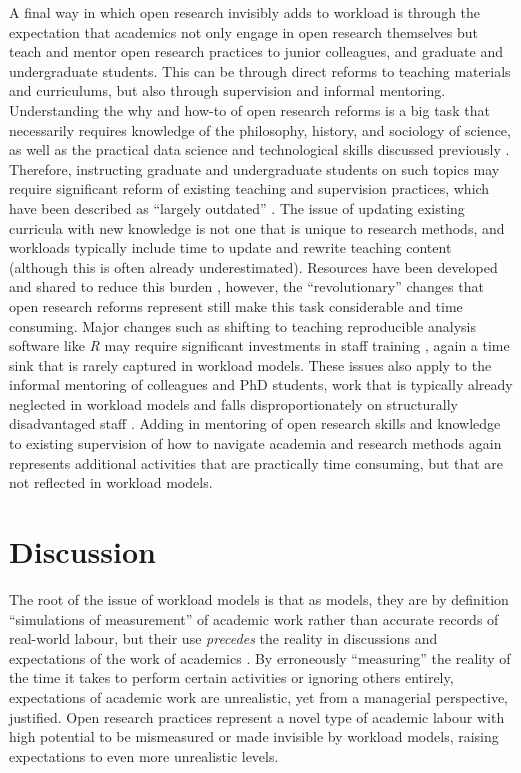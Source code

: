 \documentclass[ authordate, meta, issue]{jote-new-article}
\begin{document}
A final way in which open research invisibly adds to workload is through the expectation that academics not only engage in open research themselves but teach and mentor open research practices to junior colleagues, and graduate and undergraduate students. This can be through direct reforms to teaching materials and curriculums, but also through supervision and informal mentoring. Understanding the why and how-to of open research reforms is a big task that necessarily requires knowledge of the philosophy, history, and sociology of science, as well as the practical data science and technological skills discussed previously \parencites{Crüwell2019}. Therefore, instructing graduate and undergraduate students on such topics may require significant reform of existing teaching and supervision practices, which have been described as “largely outdated” \parencites{Azevedo2022}. The issue of updating existing curricula with new knowledge is not one that is unique to research methods, and workloads typically include time to update and rewrite teaching content (although this is often already underestimated). Resources have been developed and shared to reduce this burden \parencites[e.g., lesson plans][]{Pownall2021}, however, the “revolutionary” changes that open research reforms represent \parencites{Spellman2015} still make this task considerable and time consuming. Major changes such as shifting to teaching reproducible analysis software like \emph{R} may require significant investments in staff training \parencites[e.g.][]{Barr2019}, again a time sink that is rarely captured in workload models. These issues also apply to the informal mentoring of colleagues and PhD students, work that is typically already neglected in workload models and falls disproportionately on structurally disadvantaged staff \parencites{Gordon2022}. Adding in mentoring of open research skills and knowledge to existing supervision of how to navigate academia and research methods again represents additional activities that are practically time consuming, but that are not reflected in workload models.



\section{Discussion}



The root of the issue of workload models is that as models, they are by definition “simulations of measurement” of academic work rather than accurate records of real-world labour, but their use \emph{precedes} the reality in discussions and expectations of the work of academics \parencites{Papadopoulos2017}. By erroneously “measuring” the reality of the time it takes to perform certain activities or ignoring others entirely, expectations of academic work are unrealistic, yet from a managerial perspective, justified. Open research practices represent a novel type of academic labour with high potential to be mismeasured or made invisible by workload models, raising expectations to even more unrealistic levels.
\end{document}
